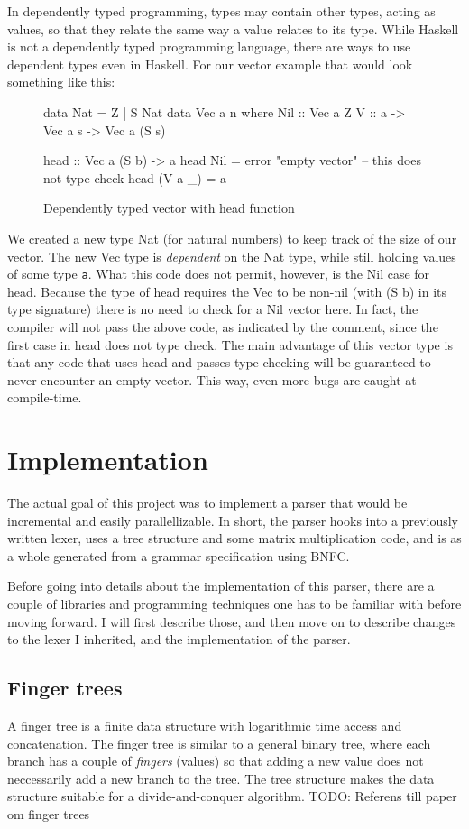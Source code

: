 \documentclass[a4paper,12pt,twosided]{report}
\begin{document}
In dependently typed programming, types may contain other types, acting as
values, so that they relate the same way a value relates to its type. While
Haskell is not a dependently typed programming language, there are ways to use
dependent types even in Haskell. For our vector example that would look
something like this:
\begin{figure}[H]
\begin{code}
data Nat = Z | S Nat
data Vec a n where
    Nil :: Vec a Z
    V :: a -> Vec a s -> Vec a (S s)

head :: Vec a (S b) -> a
head Nil = error "empty vector" -- this does not type-check
head (V a _) = a
\end{code}
\caption{Dependently typed vector with head function}
\end{figure}
We created a new type Nat (for natural numbers) to keep track of the size of our
vector. The new Vec type is \textit{dependent} on the Nat type, while still
holding values of some type \texttt{a}. What this code does not permit, however,
is the Nil case for head. Because the type of head requires the Vec to be
non-nil (with (S b) in its type signature) there is no need to check for a Nil
vector here. In fact, the compiler will not pass the above code, as indicated by
the comment, since the first case in head does not type check. The main
advantage of this vector type is that any code that uses head and passes
type-checking will be guaranteed to never encounter an empty vector.  This way,
even more bugs are caught at compile-time.

%
%

\chapter{Implementation}
The actual goal of this project was to implement a parser that would be
incremental and easily parallellizable. In short, the parser hooks into a
previously written lexer, uses a tree structure and some matrix multiplication
code, and is as a whole generated from a grammar specification using BNFC.

Before going into details about the implementation of this parser, there are a
couple of libraries and programming techniques one has to be familiar with
before moving forward. I will first describe those, and then move on to describe
changes to the lexer I inherited, and the implementation of the parser.

\section{Finger trees}
A finger tree is a finite data structure with logarithmic time access and
concatenation. The finger tree is similar to a general binary tree, where each
branch has a couple of \textit{fingers} (values) so that adding a new value does
not neccessarily add a new branch to the tree. The tree structure makes the data
structure suitable for a divide-and-conquer algorithm. TODO: Referens till paper
om finger trees
\end{document}
